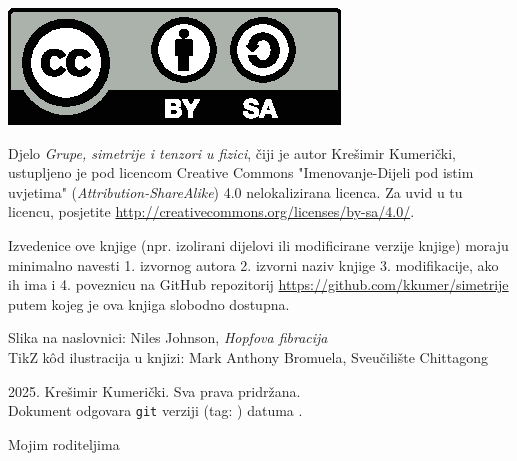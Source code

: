
\thispagestyle{empty}

\vspace*{20em}


\centerline{\includegraphics[scale=1.0,clip]{figures/by-sa.eps}}
Djelo \emph{Grupe, simetrije i tenzori u fizici}, čiji je autor Krešimir
Kumerički, ustupljeno je pod licencom Creative Commons 
"Imenovanje-Dijeli pod istim uvjetima" (\emph{Attribution-ShareAlike}) 
4.0 nelokalizirana licenca. Za uvid u tu licencu, posjetite
\url{http://creativecommons.org/licenses/by-sa/4.0/}.

Izvedenice ove knjige (npr. izolirani dijelovi ili modificirane verzije knjige) moraju minimalno
navesti 1. izvornog autora 2. izvorni naziv knjige 3. modifikacije, ako ih ima i
4. poveznicu na GitHub repozitorij
\url{https://github.com/kkumer/simetrije} putem kojeg je ova knjiga
slobodno dostupna.

\vspace*{5em}
Slika na naslovnici: Niles Johnson, \emph{Hopfova fibracija}\\
TikZ k\^{o}d ilustracija u knjizi: Mark Anthony Bromuela, Sveučilište Chittagong

\vspace*{5em}
\textcopyright{} 2025. Krešimir Kumerički. Sva prava pridržana.\\
\small
Dokument odgovara \texttt{git} verziji \texttt{\githash} (tag: \texttt{\gittag}) datuma \gitdate.

\cleardoublepage
\thispagestyle{empty}
\vspace*{20em}
\begin{flushright}
Mojim roditeljima
\end{flushright}
\cleardoublepage
